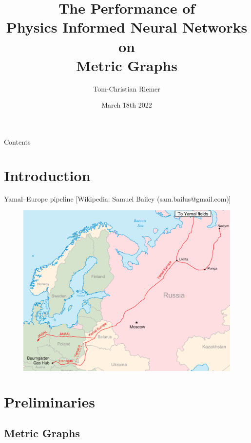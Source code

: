 \documentclass[9pt]{beamer}
\title{The Performance of \\ Physics Informed Neural Networks on \\ Metric Graphs}
\author{Tom-Christian Riemer}
\institute{TU Chemnitz}
\date{March 18th 2022}
\begin{document}
\maketitle

\begin{frame}{Contents}
  \tableofcontents
\end{frame}

\section{Introduction}

\begin{frame}{Yamal–Europe pipeline}
    \vspace{-1\baselineskip}\hfill{\tiny{[Wikipedia: Samuel Bailey (sam.bailus@gmail.com)]}}
    \begin{figure}[H]
        \begin{center}
            \includegraphics[scale=0.45]{img/Yamal-europe.png}
        \end{center}
    \end{figure}
\end{frame}

\section{Preliminaries}

\subsection{Metric Graphs}
\end{document}
